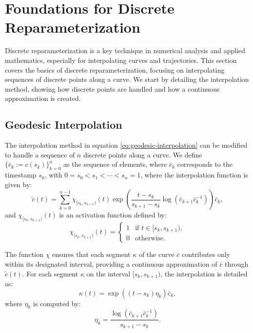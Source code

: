 \section{Foundations for Discrete Reparameterization}
\label{sec:foundation-for-discrete-reparametrization}

Discrete reparameterization is a key technique in numerical analysis and applied mathematics, especially for interpolating curves and trajectories. This section covers the basics of discrete reparameterization, focusing on interpolating sequences of discrete points along a curve. We start by detailing the interpolation method, showing how discrete points are handled and how a continuous approximation is created.

\subsection{Geodesic Interpolation}
\label{subsec:geodesic-interpolation-discrete}

The interpolation method in equation \eqref{eq:geodesic-interpolation} can be modified to handle a sequence of \(n\) discrete points along a curve. We define \(\{\bar{c}_k := c(s_k)\}_{k=0}^n\) as the sequence of elements, where \(\bar{c}_k\) corresponds to the timestamp \(s_k\), with \(0 = s_0 < s_1 < \cdots < s_n = 1\), where the interpolation function is given by:
\begin{equation}
    \tilde{c}(t) = \sum_{k=0}^{n-1} \chi_{[s_k, s_{k+1})}(t) \exp\left(\frac{t - s_k}{s_{k+1} - s_k} \log\left(\bar{c}_{k+1} \bar{c}_k^{-1}\right)\right) \bar{c}_k,
    \label{eq:interpolation-discrete}
\end{equation}
and \(\chi_{[s_k, s_{k+1})}(t)\) is an activation function defined by:
\begin{equation}
    \chi_{[s_k, s_{k+1})}(t) = 
    \begin{cases} 
    1 & \text{if } t \in [s_k, s_{k+1}), \\
    0 & \text{otherwise}.
    \end{cases}
    \label{eq:activation-discrete}
\end{equation}

The function \(\chi\) ensures that each segment \(\kappa\) of the curve \(\bar{c}\) contributes only within its designated interval, providing a continuous approximation of \(\bar{c}\) through \(\tilde{c}(t)\). For each segment \(\kappa\) on the interval \([s_k, s_{k+1})\), the interpolation is detailed as:
\begin{equation}
    \kappa(t) = \exp\left((t - s_k)\eta_k\right)\bar{c}_k,
    \label{eq:interpolation-curve-segment}
\end{equation}
where \(\eta_k\) is computed by:
\begin{equation}
    \eta_k = \frac{\log(\bar{c}_{k+1} \bar{c}_k^{-1})}{s_{k+1} - s_k}.
    \label{eq:eta}
\end{equation}

